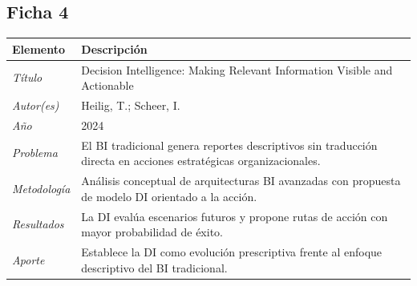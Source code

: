 \documentclass[conference]{IEEEtran}
\begin{document}
\subsection*{Ficha 4}
\begin{center}
\small
\begin{minipage}{\columnwidth}
\label{tab:ficha4}
\begin{tabular}{p{1.6cm} p{5.9cm}}
\toprule
\textbf{Elemento} & \textbf{Descripción} \\
\midrule
\textit{Título} & Decision Intelligence: Making Relevant Information Visible and Actionable \\
\addlinespace
\textit{Autor(es)} & Heilig, T.; Scheer, I. \\
\addlinespace
\textit{Año} & 2024 \\
\addlinespace
\textit{Problema} & El BI tradicional genera reportes descriptivos sin traducción directa en acciones estratégicas organizacionales. \\
\addlinespace
\textit{Metodología} & Análisis conceptual de arquitecturas BI avanzadas con propuesta de modelo DI orientado a la acción. \\
\addlinespace
\textit{Resultados} & La DI evalúa escenarios futuros y propone rutas de acción con mayor probabilidad de éxito. \\
\addlinespace
\textit{Aporte} & Establece la DI como evolución prescriptiva frente al enfoque descriptivo del BI tradicional. \\
\bottomrule
\end{tabular}
\end{minipage}
\end{center}
 
\end{document}
